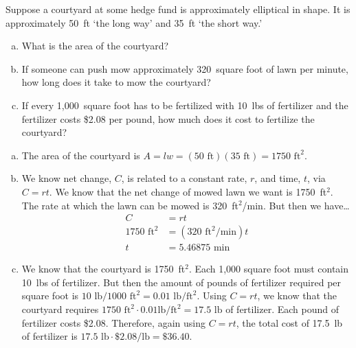 \documentclass[11pt,letterpaper]{article}
\begin{document}
\newpage



 Suppose a courtyard at some hedge fund is approximately elliptical in shape. It is approximately 50~ft `the long way' and 35~ft `the short way.'
	\begin{enumerate}[(a)]
	\item What is the area of the courtyard?
	\item If someone can push mow approximately 320~square foot of lawn per minute, how long does it take to mow the courtyard?
	\item If every 1,000~square foot has to be fertilized with 10~lbs of fertilizer and the fertilizer costs \$2.08 per pound, how much does it cost to fertilize the courtyard?
	\end{enumerate} \pspace

\sol 
\begin{enumerate}[(a)]
\item The area of the courtyard is $A= lw= (50 \text{ ft})(35 \text{ ft})= 1750 \text{ ft}^2$. \pspace

\item We know net change, $C$, is related to a constant rate, $r$, and time, $t$, via $C= rt$. We know that the net change of mowed lawn we want is 1750~ft$^2$. The rate at which the lawn can be mowed is 320~ft$^2$/min. But then we have\dots
	\[
	\begin{aligned}
	C&= rt \\[0.3cm]
	1750 \text{ ft}^2&= (320 \text{ ft}^2/\text{min}) t \\[0.3cm]
	t&= 5.46875 \text{ min}
	\end{aligned}
	\]

\item We know that the courtyard is 1750~ft$^2$. Each 1,000 square foot must contain 10~lbs of fertilizer. But then the amount of pounds of fertilizer required per square foot is $10 \text{ lb}/1000 \text{ ft}^2= 0.01 \text{ lb}/\text{ft}^2$. Using $C= rt$, we know that the courtyard requires $1750 \text{ ft}^2 \cdot 0.01 \text{lb}/\text{ft}^2= 17.5 \text{ lb}$ of fertilizer. Each pound of fertilizer costs \$2.08. Therefore, again using $C= rt$, the total cost of 17.5~lb of fertilizer is $17.5 \text{ lb} \cdot \$2.08/\text{lb}= \$36.40$. 
\end{enumerate}
\end{document}
